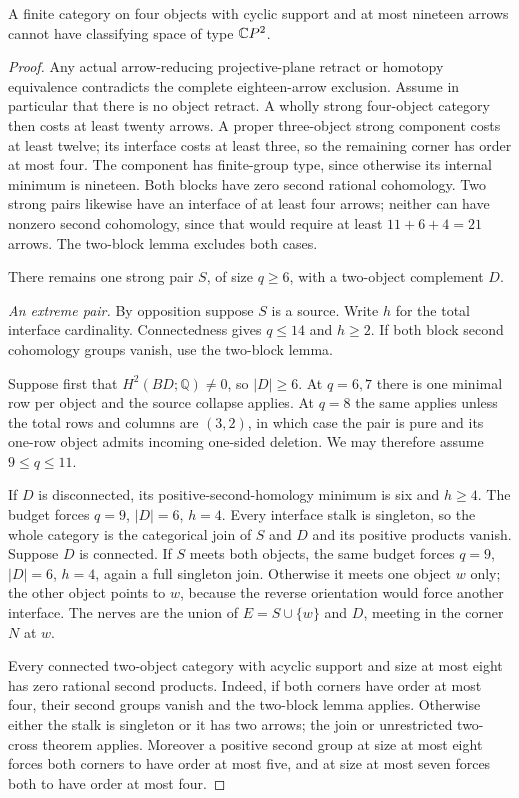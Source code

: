 \begin{theorem}
\label{CP2:A-strong-four-nineteen}
A finite category on four objects with cyclic support and at most
nineteen arrows cannot have classifying space of type $\mathbb{C}P^2$.
\end{theorem}
\begin{proof}
Any actual arrow-reducing projective-plane retract or homotopy
equivalence contradicts the complete eighteen-arrow exclusion.
Assume in particular that there is no object retract. A wholly
strong four-object category then costs at least twenty arrows.
A proper three-object strong component costs at least twelve;
its interface costs at least three, so the remaining corner has
order at most four. The component has finite-group type, since
otherwise its internal minimum is nineteen. Both blocks have
zero second rational cohomology. Two strong pairs likewise have
an interface of at least four arrows; neither can have nonzero
second cohomology, since that would require at least
$11+6+4=21$ arrows. The two-block lemma excludes both cases.

There remains one strong pair $S$, of size $q\ge6$, with a
two-object complement $D$.

\emph{An extreme pair.} By opposition suppose $S$ is a source.
Write $h$ for the total interface cardinality. Connectedness gives
$q\le14$ and $h\ge2$. If both block second cohomology groups
vanish, use the two-block lemma.

Suppose first that $H^2(BD;\mathbb Q)\ne0$, so $|D|\ge6$.
At $q=6,7$ there is one minimal row per object and the source
collapse applies. At $q=8$ the same applies unless the total
rows and columns are $(3,2)$, in which case the pair is pure
and its one-row object admits incoming one-sided deletion.
We may therefore assume $9\le q\le11$.

If $D$ is disconnected, its positive-second-homology minimum is
six and $h\ge4$. The budget forces $q=9$, $|D|=6$, $h=4$.
Every interface stalk is singleton, so the whole category is the
categorical join of $S$ and $D$ and its positive products vanish.
Suppose $D$ is connected. If $S$ meets both objects, the same
budget forces $q=9$, $|D|=6$, $h=4$, again a full singleton join.
Otherwise it meets one object $w$ only; the other object points
to $w$, because the reverse orientation would force another
interface. The nerves are the union of $E=S\cup\{w\}$ and
$D$, meeting in the corner $N$ at $w$.

Every connected two-object category with acyclic support and size
at most eight has zero rational second products. Indeed, if both corners have
order at most four, their second groups vanish and the two-block
lemma applies. Otherwise either the stalk is singleton or it has
two arrows; the join or unrestricted two-cross theorem applies.
Moreover a positive second group at size at most eight forces
both corners to have order at most five, and at size at most
seven forces both to have order at most four.


\end{proof}
